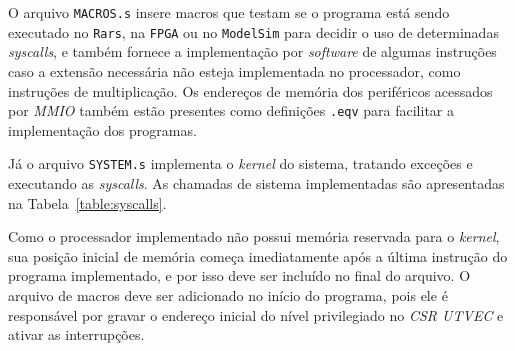     { O arquivo \texttt{MACROS.s} insere macros que testam se o programa
        está sendo executado no \texttt{Rars}, na \texttt{FPGA} ou no
        \texttt{ModelSim} para decidir o uso de determinadas \textit{syscalls},
        e também fornece a implementação por \textit{software} de algumas
        instruções caso a extensão necessária não esteja implementada no processador,
        como instruções de multiplicação. Os endereços de memória dos periféricos
        acessados por \textit{MMIO} também estão presentes como definições
        \texttt{.eqv} para facilitar a implementação dos programas.
    }

    { Já o arquivo \texttt{SYSTEM.s} implementa o \textit{kernel} do sistema,
        tratando exceções e executando as \textit{syscalls}. As chamadas de
        sistema implementadas são apresentadas na Tabela~\ref{table:syscalls}.
    }

    { Como o processador implementado não possui memória reservada para o
        \textit{kernel}, sua posição inicial de memória começa imediatamente
        após a última instrução do programa implementado, e por isso deve ser
        incluído no final do arquivo. O arquivo de macros deve ser adicionado
        no início do programa, pois ele é responsável por gravar o endereço inicial
        do nível privilegiado no \textit{CSR UTVEC} e ativar as interrupções.
    }

